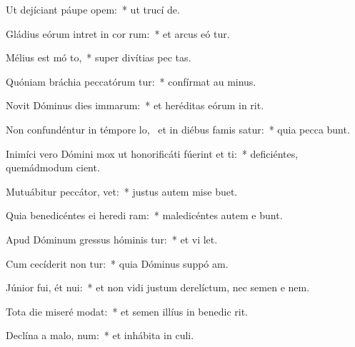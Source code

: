 \item Ut dejíciant páupe  opem:~* ut trucí  de.
\item Gládius eórum intret in cor rum:~* et arcus eó tur.
\item Mélius est mó to,~* super divítias pec tas.
\item Quóniam bráchia peccatórum tur:~* confírmat au  minus.
\item Novit Dóminus dies immarum:~* et heréditas eórum in  rit.
\item Non confundéntur in témpore lo,~\pscross{} et in diébus famis satur:~* quia pecca bunt.
\item Inimíci vero Dómini mox ut honorificáti fúerint et ti:~* deficiéntes, quemádmodum  cient.
\item Mutuábitur peccátor,   vet:~* justus autem mise  buet.
\item Quia benedicéntes ei heredi ram:~* maledicéntes autem e bunt.
\item Apud Dóminum gressus hóminis tur:~* et vi  let.
\item Cum cecíderit non tur:~* quia Dóminus suppó  am.
\item Júnior fui, ét nui:~* et non vidi justum derelíctum, nec semen e  nem.
\item Tota die miseré  modat:~* et semen illíus in benedic rit.
\item Declína a malo,   num:~* et inhábita in  culi.
